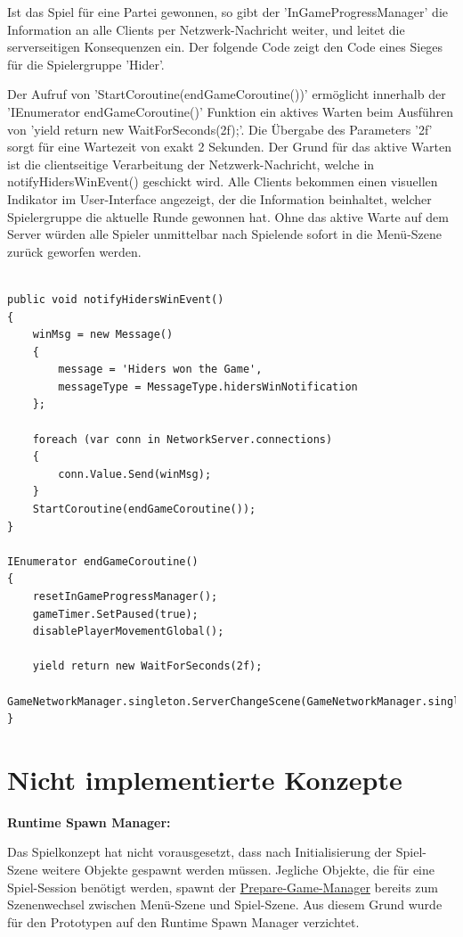 Ist das Spiel für eine Partei gewonnen, so gibt der 'InGameProgressManager' die Information an alle Clients per Netzwerk-Nachricht weiter, und leitet die serverseitigen Konsequenzen ein. Der folgende Code zeigt den Code eines Sieges für die Spielergruppe 'Hider'. 

Der Aufruf von 'StartCoroutine(endGameCoroutine())' ermöglicht innerhalb der 'IEnumerator endGameCoroutine()' Funktion ein aktives Warten beim Ausführen von 'yield return new WaitForSeconds(2f);'. Die Übergabe des Parameters '2f' sorgt für eine Wartezeit von exakt 2 Sekunden. Der Grund für das aktive Warten ist die clientseitige Verarbeitung der Netzwerk-Nachricht, welche in notifyHidersWinEvent() geschickt wird. Alle Clients bekommen einen visuellen Indikator im User-Interface angezeigt, der die Information beinhaltet, welcher Spielergruppe die aktuelle Runde gewonnen hat. Ohne das aktive Warte auf dem Server würden alle Spieler unmittelbar nach Spielende sofort in die Menü-Szene zurück geworfen werden.

\begin{lstlisting}[caption= InGameProgressManager.cs Win Event]
	
public void notifyHidersWinEvent()
{
	winMsg = new Message()
	{
		message = 'Hiders won the Game',
		messageType = MessageType.hidersWinNotification
	};
		
	foreach (var conn in NetworkServer.connections)
	{
		conn.Value.Send(winMsg);
	}	
	StartCoroutine(endGameCoroutine());
}

IEnumerator endGameCoroutine()
{
	resetInGameProgressManager();
	gameTimer.SetPaused(true);
	disablePlayerMovementGlobal();
	
	yield return new WaitForSeconds(2f);
	GameNetworkManager.singleton.ServerChangeScene(GameNetworkManager.singleton.offlineScene);
}

\end{lstlisting}

\section{Nicht implementierte Konzepte}
\textbf{Runtime Spawn Manager:}

Das Spielkonzept hat nicht vorausgesetzt, dass nach Initialisierung der Spiel-Szene weitere Objekte gespawnt werden müssen. Jegliche Objekte, die für eine Spiel-Session benötigt werden, spawnt der \hyperref[Implementierung:prepare_game_manager]{Prepare-Game-Manager} bereits zum Szenenwechsel zwischen Menü-Szene und Spiel-Szene. Aus diesem Grund wurde für den Prototypen auf den Runtime Spawn Manager verzichtet.

